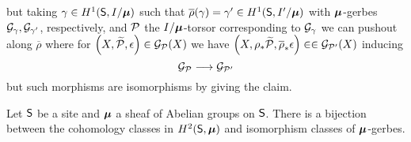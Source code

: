 but taking $\gamma\in H^{1}(\mathsf{S},I/\bm{\mu})$ such that $\overline{\rho}(\gamma)=\gamma'\in H^{1}(\mathsf{S},I'/\bm{\mu})$ with $\bm{\mu}$-gerbes $\mathcal{G}_{\gamma},\mathcal{G}_{\gamma'}$, respectively, and $\mathcal{P}$ the $I/\bm{\mu}$-torsor corresponding to $\mathcal{G}_{\gamma}$ we can pushout along $\overline{\rho}$ where for $\left(X,\widetilde{\mathcal{P}},\epsilon\right)\in\mathcal{G}_{\mathcal{P}}(X)$ we have $\left(X,\rho_{*}\widetilde{\mathcal{P}},\overline{\rho}_{*}\epsilon\right)\in\in\mathcal{G}_{\mathcal{P}'}(X)$ inducing 
$$\mathcal{G}_{\mathcal{P}}\longrightarrow\mathcal{G}_{\mathcal{P}'}$$
but such morphisms are isomorphisms by  giving the claim. 
\begin{theorem}\label{thm: second cohomology is bijective with iso classes of gerbes}
    Let $\mathsf{S}$ be a site and $\bm{\mu}$ a sheaf of Abelian groups on $\mathsf{S}$. There is a bijection between the cohomology classes in $H^{2}(\mathsf{S},\bm{\mu})$ and isomorphism classes of $\bm{\mu}$-gerbes. 
\end{theorem}
